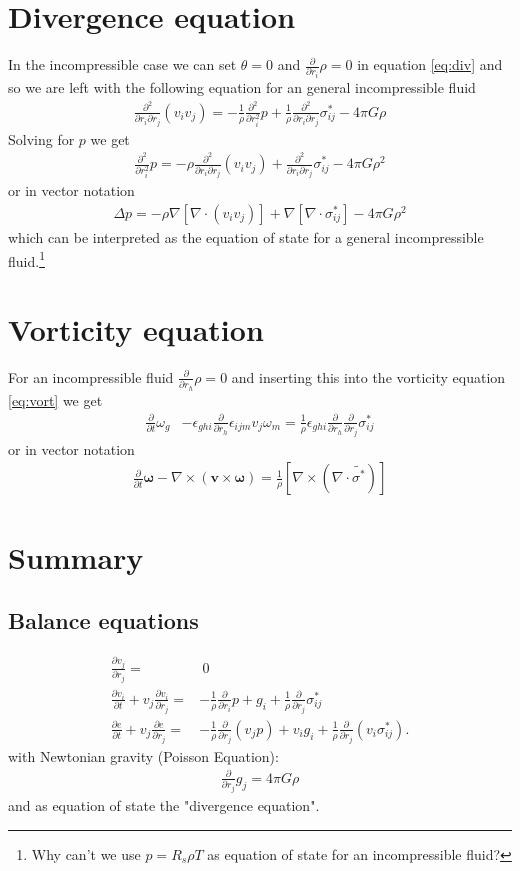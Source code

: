 \documentclass[a4paper,
					12pt,
					twoside,
					openright
					]{book}
\renewcommand{\vec}[1]{\boldsymbol{#1}}
\newcommand{\lrb}[1]{{ \left[ #1 \right] }}
\newcommand{\pd}[1]{\frac{\partial}{\partial #1}}
\newcommand{\ppd}[2]{\frac{\partial #2}{\partial #1}}
\newcommand{\pdd}[1]{\frac{\partial^2}{\partial #1^2}}
\begin{document}
\section{Divergence equation}
In the incompressible case we can set $\theta=0$ and $\pd{r_i}\rho=0$ in
equation \eqref{eq:div} and so we are left with the following equation for an
general incompressible fluid
\begin{align}
\frac{\partial^2}{\partial r_i \partial r_j}(v_i v_j) = 
-\frac{1}{\rho}\pdd{r_i}p 
+\frac{1}{\rho}\frac{\partial^2}{\partial r_i \partial r_j}\sigma^*_{ij} 
- 4\pi G \rho
\end{align}
Solving for $p$ we get
\begin{align}
\pdd{r_i}p= 
-\rho \frac{\partial^2}{\partial r_i \partial r_j}(v_i v_j)
+\frac{\partial^2}{\partial r_i \partial r_j}\sigma^*_{ij} 
-4\pi G \rho^2
\end{align}
or in vector notation
\begin{align}
\Delta p = 
-\rho \nabla\lrb{\nabla\cdot(v_i v_j)} 
+\nabla\lrb{\nabla\cdot \sigma^*_{ij}}
- 4\pi G \rho^2
\end{align}
which can be interpreted as the equation of state for a general
incompressible fluid.\footnote{Why can't we use $p=R_s \rho T$ as equation of
state for an incompressible fluid?} 

\section{Vorticity equation}
For an incompressible fluid $\pd{r_h}\rho = 0$ and inserting this into
the vorticity equation \eqref{eq:vort} we get
\begin{align}
\pd{t}\omega_g
&-\epsilon_{ghi}\pd{r_h} \epsilon_{ijm} v_j \omega_m =
\frac{1}{\rho}\epsilon_{ghi}\pd{r_h}\pd{r_j}\sigma^*_{ij}
\end{align}
or in vector notation
\begin{align}
\pd{t} \vec{\omega}-\nabla \times (\vec{v} \times \vec{\omega}) = 
\frac{1}{\rho} \lrb{\nabla \times (\nabla \cdot \tilde{\sigma^*})}
\end{align}

\section{Summary}
\subsection*{Balance equations}
\begin{align}
\ppd{r_j}{v_j} =&\ 0 \label{eq:icmass}\\
\ppd{t}{v_i} + v_j \ppd{r_j}{v_i} =& -\frac{1}{\rho}\pd{r_i}p + g_i
+\frac{1}{\rho}\pd{r_j}\sigma^*_{ij}\label{eq:icmom}\\
\ppd{t}{e} + v_j \ppd{r_j}{e} =& -\frac{1}{\rho} \pd{r_j}(v_j p) + v_i g_i
+\frac{1}{\rho}\pd{r_j}(v_i \sigma^*_{ij}).\label{eq:icetot}
\end{align}
with Newtonian gravity (Poisson Equation):
\begin{align}
\pd{r_j}g_j=4\pi G \rho
\end{align}
and as equation of state the "divergence equation".
\end{document}
